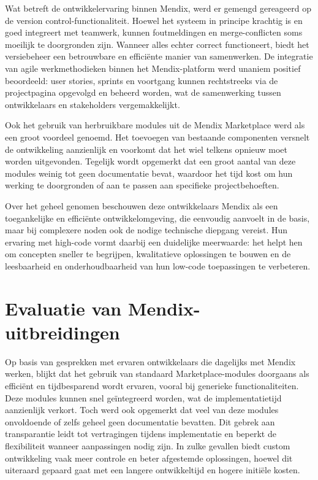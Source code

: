 Wat betreft de ontwikkelervaring binnen Mendix, werd er gemengd gereageerd op de version control-functionaliteit. Hoewel het systeem in principe krachtig is en goed integreert met teamwerk, kunnen foutmeldingen en merge-conflicten soms moeilijk te doorgronden zijn. Wanneer alles echter correct functioneert, biedt het versiebeheer een betrouwbare en efficiënte manier van samenwerken. De integratie van agile werkmethodieken binnen het Mendix-platform werd unaniem positief beoordeeld: user stories, sprints en voortgang kunnen rechtstreeks via de projectpagina opgevolgd en beheerd worden, wat de samenwerking tussen ontwikkelaars en stakeholders vergemakkelijkt.

Ook het gebruik van herbruikbare modules uit de Mendix Marketplace werd als een groot voordeel genoemd. Het toevoegen van bestaande componenten versnelt de ontwikkeling aanzienlijk en voorkomt dat het wiel telkens opnieuw moet worden uitgevonden. Tegelijk wordt opgemerkt dat een groot aantal van deze modules weinig tot geen documentatie bevat, waardoor het tijd kost om hun werking te doorgronden of aan te passen aan specifieke projectbehoeften. 

Over het geheel genomen beschouwen deze ontwikkelaars Mendix als een toegankelijke en efficiënte ontwikkelomgeving, die eenvoudig aanvoelt in de basis, maar bij complexere noden ook de nodige technische diepgang vereist. Hun ervaring met high-code vormt daarbij een duidelijke meerwaarde: het helpt hen om concepten sneller te begrijpen, kwalitatieve oplossingen te bouwen en de leesbaarheid en onderhoudbaarheid van hun low-code toepassingen te verbeteren.

\section{Evaluatie van Mendix-uitbreidingen}
Op basis van gesprekken met ervaren ontwikkelaars die dagelijks met Mendix werken, blijkt dat het gebruik van standaard Marketplace-modules doorgaans als efficiënt en tijdbesparend wordt ervaren, vooral bij generieke functionaliteiten. Deze modules kunnen snel geïntegreerd worden, wat de implementatietijd aanzienlijk verkort. Toch werd ook opgemerkt dat veel van deze modules onvoldoende of zelfs geheel geen documentatie bevatten. Dit gebrek aan transparantie leidt tot vertragingen tijdens implementatie en beperkt de flexibiliteit wanneer aanpassingen nodig zijn. In zulke gevallen biedt custom ontwikkeling vaak meer controle en beter afgestemde oplossingen, hoewel dit uiteraard gepaard gaat met een langere ontwikkeltijd en hogere initiële kosten.

